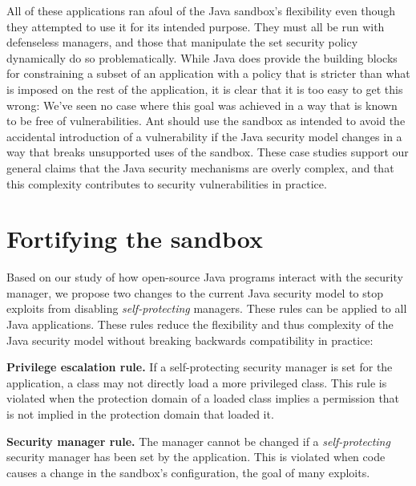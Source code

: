 \documentclass{sig-alternate}
\begin{document}
All of these applications ran afoul of the Java sandbox's flexibility even
though they attempted to use it for its intended purpose. 
They must all be run with defenseless managers, and those that 
manipulate the set security policy dynamically do so problematically.  
While Java does provide the
building blocks for constraining a subset of an application with a policy that
is stricter than what is imposed on the rest of the application, it is clear
that it is too easy to get this wrong:  We've seen no case where this goal was
achieved in a way that is known to be free of vulnerabilities. Ant should use the sandbox as intended to avoid the accidental introduction of a vulnerability if the Java security model changes in a way that breaks unsupported uses of the sandbox. These case
studies support our general claims that the Java security mechanisms are overly
complex, and that this complexity contributes to security vulnerabilities in
practice.  

\section{Fortifying the sandbox}\label{sec:Rules-for-Fortifying}

Based on our study of how open-source Java programs interact with the security
manager, we propose two changes to the current Java security model to stop exploits
from disabling \emph{self-protecting} managers.  These rules can be applied
to all Java applications.
These rules reduce the flexibility and thus complexity of the
Java security model without breaking backwards compatibility in practice:

\noindent\textbf{Privilege escalation rule.} If a self-protecting
security manager is set for the application, a class may not directly
load a more privileged class. This rule is violated when the protection
domain of a loaded class implies a permission that is not implied
in the protection domain that loaded it. 

\noindent \textbf{Security manager rule.} The manager cannot
be changed if a \emph{self-protecting} security manager has been set
by the application. This is violated when code causes a change
in the sandbox's configuration, the goal of many exploits.
\end{document}
